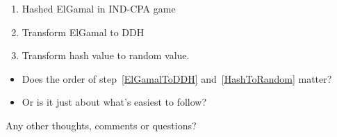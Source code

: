 \begin{frame}
  \begin{example}
    \begin{enumerate}
      \item Hashed ElGamal in IND-CPA game
      \item\label{ElGamalToDDH} Transform ElGamal to DDH
      \item\label{HashToRandom} Transform hash value to random value.
    \end{enumerate}
  \end{example}

  \begin{question}
    \begin{itemize}
      \item Does the order of step~\ref{ElGamalToDDH} and~\ref{HashToRandom} 
        matter?
      \item Or is it just about what's easiest to follow?
    \end{itemize}
  \end{question}
\end{frame}

\begin{frame}
  \begin{question}
    Any other thoughts, comments or questions?
  \end{question}
\end{frame}



\begin{frame}[allowframebreaks]
  \printbibliography{}
\end{frame}
